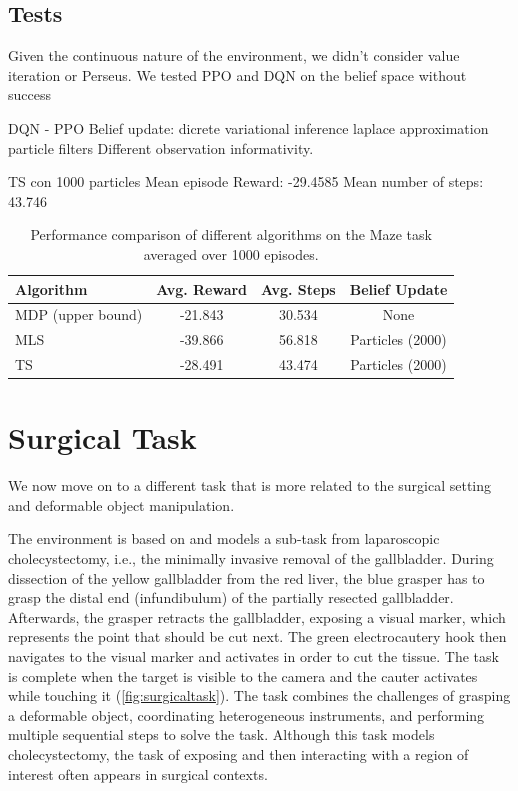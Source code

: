 \subsection{Tests}

Given the continuous nature of the environment, we didn't consider value iteration or 
Perseus. We tested PPO and DQN on the belief space without success

DQN - PPO 
Belief update: dicrete variational inference laplace approximation particle filters 
Different observation informativity.

TS con 1000 particles
Mean episode Reward:  -29.4585
Mean number of steps:  43.746

\begin{table}[h]
    \centering
    \begin{tabular}{lccc}
    \toprule
    \textbf{Algorithm} & \textbf{Avg. Reward} & \textbf{Avg. Steps} & \textbf{Belief Update}\\
    \midrule
    MDP (upper bound) & -21.843 & 30.534 & None\\
    MLS & -39.866 & 56.818  & Particles (2000)  \\
    TS & -28.491 & 43.474  & Particles (2000)  \\

    \bottomrule
    \end{tabular}
    \caption{Performance comparison of different algorithms on the Maze task averaged
    over 1000 episodes.}
    \label{tab:maze_results}
\end{table}
    

\section{Surgical Task}
We now move on to a different task that is more related to the surgical setting and
deformable object manipulation.


The environment is based on \cite{10.5555/3648699.3649067} and models a sub-task from laparoscopic cholecystectomy, i.e., 
the minimally invasive removal of the gallbladder. 
During dissection of the yellow gallbladder from the red liver, the blue
grasper has to grasp the distal end (infundibulum) of the partially 
resected gallbladder. Afterwards, the grasper retracts the gallbladder,
exposing a visual marker, which represents the point that should be
cut next. The green electrocautery hook then navigates to the visual
marker and activates in order to cut the tissue. The task is complete
when the target is visible to the camera and the cauter activates while
touching it (\cref{fig:surgicaltask}).
The task combines the challenges of grasping a deformable object, coordinating 
heterogeneous instruments, and performing multiple sequential steps to solve the task. Although
this task models cholecystectomy, the task of exposing
and then interacting with a region of interest often appears in surgical contexts.

